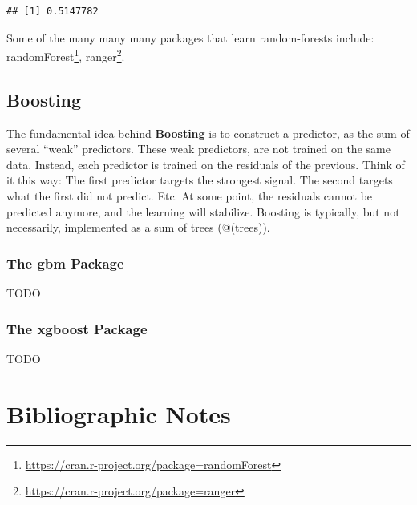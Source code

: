 \documentclass[]{book}
\renewcommand{\href}[2]{#2\footnote{\url{#1}}}
\theoremstyle{definition}
\theoremstyle{definition}
\theoremstyle{definition}
\theoremstyle{remark}
\begin{document}
\begin{verbatim}
## [1] 0.5147782
\end{verbatim}

Some of the many many many packages that learn random-forests include: \href{https://cran.r-project.org/package=randomForest}{randomForest}, \href{https://cran.r-project.org/package=ranger}{ranger}.

\hypertarget{boosting}{%
\subsection{Boosting}\label{boosting}}

The fundamental idea behind \textbf{Boosting} is to construct a predictor, as the sum of several ``weak'' predictors.
These weak predictors, are not trained on the same data.
Instead, each predictor is trained on the residuals of the previous.
Think of it this way:
The first predictor targets the strongest signal.
The second targets what the first did not predict.
Etc.
At some point, the residuals cannot be predicted anymore, and the learning will stabilize.
Boosting is typically, but not necessarily, implemented as a sum of trees (@(trees)).

\hypertarget{the-gbm-package}{%
\subsubsection{The gbm Package}\label{the-gbm-package}}

TODO

\hypertarget{the-xgboost-package}{%
\subsubsection{The xgboost Package}\label{the-xgboost-package}}

TODO

\hypertarget{bibliographic-notes-8}{%
\section{Bibliographic Notes}\label{bibliographic-notes-8}}
\end{document}
